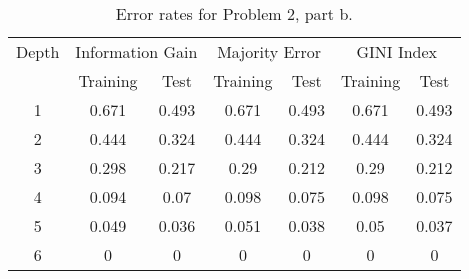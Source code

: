 \begin{table}[h]
  \centering
  \begin{tabular}{c|cc|cc|cc}
    Depth & \multicolumn{2}{c|}{Information Gain} &
    \multicolumn{2}{c|}{Majority Error} &
    \multicolumn{2}{c}{GINI Index} \\
          & Training & Test     & Training & Test     & Training & Test     \\ \hline
        1 &    0.671 &    0.493 &    0.671 &    0.493 &    0.671 &    0.493 \\ \hline
        2 &    0.444 &    0.324 &    0.444 &    0.324 &    0.444 &    0.324 \\ \hline
        3 &    0.298 &    0.217 &     0.29 &    0.212 &     0.29 &    0.212 \\ \hline
        4 &    0.094 &     0.07 &    0.098 &    0.075 &    0.098 &    0.075 \\ \hline
        5 &    0.049 &    0.036 &    0.051 &    0.038 &     0.05 &    0.037 \\ \hline
        6 &        0 &        0 &        0 &        0 &        0 &        0 \\ \hline
  \end{tabular}
  \caption{Error rates for Problem 2, part b.}
  \label{tab:p2b}
\end{table}
